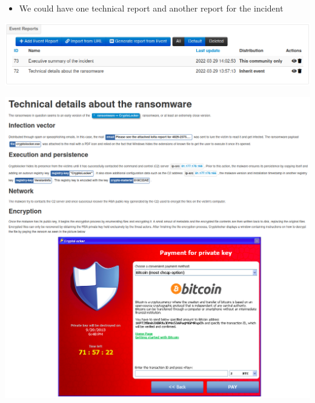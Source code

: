 \begin{frame}
    \begin{itemize}
        \item We could have one technical report and another report for the incident
    \end{itemize}
    \begin{center}
        \includegraphics[width=1.0\linewidth]{pictures/case2/event-report-list.png}
    \end{center}
\end{frame}

\begin{frame}
    \begin{center}
        \includegraphics[width=0.65\linewidth]{pictures/case2/event-report-2.png}
    \end{center}
\end{frame}


